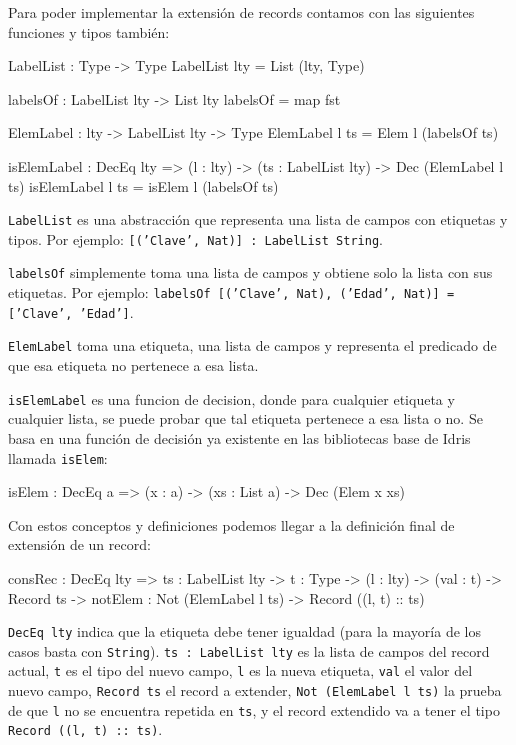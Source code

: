 Para poder implementar la extensión de records contamos con las siguientes funciones y tipos también:

\begin{code}
LabelList : Type -> Type
LabelList lty = List (lty, Type)
 
labelsOf : LabelList lty -> List lty
labelsOf = map fst

ElemLabel : lty -> LabelList lty -> Type
ElemLabel l ts = Elem l (labelsOf ts)

isElemLabel : DecEq lty => (l : lty) -> 
  (ts : LabelList lty) -> 
  Dec (ElemLabel l ts)
isElemLabel l ts = isElem l (labelsOf ts)
\end{code}

\texttt{LabelList} es una abstracción que representa una lista de campos con etiquetas y tipos. Por ejemplo: \texttt{[('Clave', Nat)] : LabelList String}.

\texttt{labelsOf} simplemente toma una lista de campos y obtiene solo la lista con sus etiquetas. Por ejemplo: \texttt{labelsOf [('Clave', Nat), ('Edad', Nat)] = ['Clave', 'Edad']}.

\texttt{ElemLabel} toma una etiqueta, una lista de campos y representa el predicado de que esa etiqueta no pertenece a esa lista.

\texttt{isElemLabel} es una funcion de decision, donde para cualquier etiqueta y cualquier lista, se puede probar que tal etiqueta pertenece a esa lista o no. Se basa en una función de decisión ya existente en las bibliotecas base de Idris llamada \texttt{isElem}:

\begin{code}
isElem : DecEq a => (x : a) -> (xs : List a) -> 
  Dec (Elem x xs)
\end{code}

Con estos conceptos y definiciones podemos llegar a la definición final de extensión de un record:

\begin{code}
consRec : DecEq lty => {ts : LabelList lty} -> 
  {t : Type} -> (l : lty) -> (val : t) ->
  Record ts -> {notElem : Not (ElemLabel l ts)} -> 
  Record ((l, t) :: ts)
\end{code}

\texttt{DecEq lty} indica que la etiqueta debe tener igualdad (para la mayoría de los casos basta con \texttt{String}). \texttt{ts : LabelList lty} es la lista de campos del record actual, \texttt{t} es el tipo del nuevo campo, \texttt{l} es la nueva etiqueta, \texttt{val} el valor del nuevo campo, \texttt{Record ts} el record a extender, \texttt{Not (ElemLabel l ts)} la prueba de que \texttt{l} no se encuentra repetida en \texttt{ts}, y el record extendido va a tener el tipo \texttt{Record ((l, t) :: ts)}.

